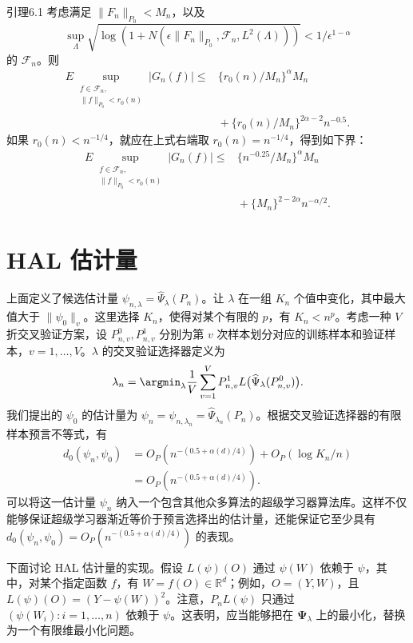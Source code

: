 \begin{bookresult}{引理}{6.1}
考虑满足 $\|F_n\|_{P_0}<M_n$，以及
\[
 \sup_\Lambda\sqrt{\log(1+N(\epsilon\|F_n\|_{P_0},\mathcal F_n,L^2(\Lambda)))}
      <1/\epsilon^{1-\alpha}
\]
的 $\mathcal F_n$。则
\[
 \begin{aligned}
 E\sup_{\substack{f\in\mathcal F_n,\\\|f\|_{P_0}<r_0(n)}}|G_n(f)|
 \leq{}&\{r_0(n)/M_n\}^{\alpha}M_n\\
       &{}+\{r_0(n)/M_n\}^{2\alpha-2}n^{-0.5}.
 \end{aligned}
\]
如果 $r_0(n)<n^{-1/4}$，就应在上式右端取 $r_0(n)=n^{-1/4}$，得到如下界：
\[
 \begin{aligned}
 E\sup_{\substack{f\in\mathcal F_n,\\\|f\|_{P_0}<r_0(n)}}|G_n(f)|
 \leq{}&\{n^{-0.25}/M_n\}^{\alpha}M_n\\
       &{}+\{M_n\}^{2-2\alpha}n^{-\alpha/2}.
 \end{aligned}
\]
\end{bookresult}

\section{HAL 估计量}
\label{sec:ch06-hal-estimator}

上面定义了候选估计量 $\psi_{n,\lambda}=\widehat\Psi_\lambda(P_n)$。让 $\lambda$ 在一组 $K_n$ 个值中变化，其中最大值大于 $\|\psi_0\|_v$。这里选择 $K_n$，使得对某个有限的 $p$，有 $K_n<n^p$。考虑一种 $V$ 折交叉验证方案，设 $P^0_{n,v},P^1_{n,v}$ 分别为第 $v$ 次样本划分对应的训练样本和验证样本，$v=1,\ldots,V$。$\lambda$ 的交叉验证选择器定义为
\[
 \lambda_n=\argmin_\lambda\frac1V\sum_{v=1}^V
              P^1_{n,v}L\bigl(\widehat\Psi_\lambda(P^0_{n,v})\bigr).
\]
我们提出的 $\psi_0$ 的估计量为 $\psi_n=\psi_{n,\lambda_n}=\widehat\Psi_{\lambda_n}(P_n)$。根据交叉验证选择器的有限样本预言不等式，有
\[
 \begin{aligned}
 d_0(\psi_n,\psi_0)
   &=O_P(n^{-(0.5+\alpha(d)/4)})+O_P(\log K_n/n)\\
   &=O_P(n^{-(0.5+\alpha(d)/4)}).
 \end{aligned}
\]
可以将这一估计量 $\psi_n$ 纳入一个包含其他众多算法的超级学习器算法库。这样不仅能够保证超级学习器渐近等价于预言选择出的估计量，还能保证它至少具有 $d_0(\psi_n,\psi_0)=O_P(n^{-(0.5+\alpha(d)/4)})$ 的表现。

下面讨论 HAL 估计量的实现。假设 $L(\psi)(O)$ 通过 $\psi(W)$ 依赖于 $\psi$，其中，对某个指定函数 $f$，有 $W=f(O)\in\mathbb R^d$；例如，$O=(Y,W)$，且 $L(\psi)(O)=(Y-\psi(W))^2$。注意，$P_nL(\psi)$ 只通过 $(\psi(W_i):i=1,\ldots,n)$ 依赖于 $\psi$。这表明，应当能够把在 $\boldsymbol{\Psi}_\lambda$ 上的最小化，替换为一个有限维最小化问题。

